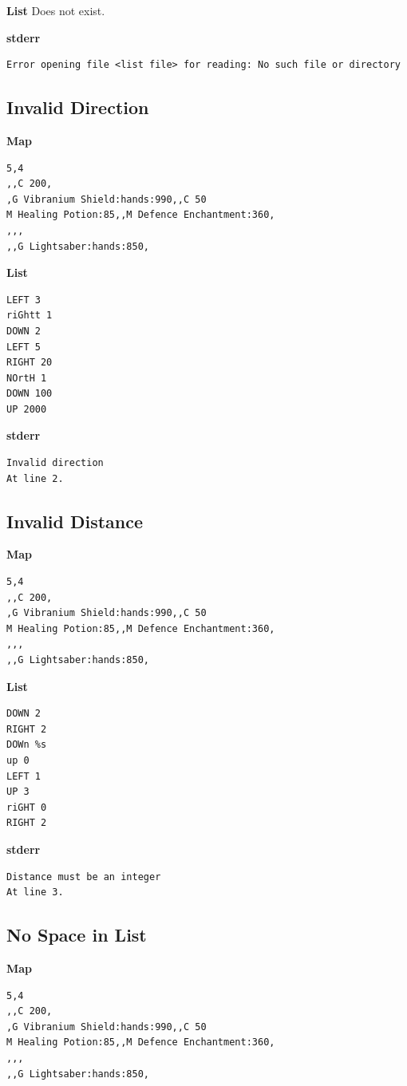 \documentclass{article}
\begin{document}
\textbf{List}
Does not exist.
\pagebreak

\textbf{stderr}
\begin{lstlisting}
Error opening file <list file> for reading: No such file or directory
\end{lstlisting}

\subsection{Invalid Direction}
\quad \textbf{Map}
\begin{lstlisting}
5,4
,,C 200,
,G Vibranium Shield:hands:990,,C 50
M Healing Potion:85,,M Defence Enchantment:360,
,,,
,,G Lightsaber:hands:850,
\end{lstlisting}

\textbf{List}
\begin{lstlisting}
LEFT 3
riGhtt 1
DOWN 2
LEFT 5
RIGHT 20
NOrtH 1
DOWN 100
UP 2000
\end{lstlisting}
\pagebreak

\textbf{stderr}
\begin{lstlisting}
Invalid direction
At line 2.
\end{lstlisting}

\subsection{Invalid Distance}

\quad \textbf{Map}
\begin{lstlisting}
5,4
,,C 200,
,G Vibranium Shield:hands:990,,C 50
M Healing Potion:85,,M Defence Enchantment:360,
,,,
,,G Lightsaber:hands:850,
\end{lstlisting}

\textbf{List}
\begin{lstlisting}
DOWN 2
RIGHT 2
DOWn %s
up 0
LEFT 1
UP 3
riGHT 0
RIGHT 2
\end{lstlisting}
\pagebreak

\textbf{stderr}
\begin{lstlisting}
Distance must be an integer
At line 3.
\end{lstlisting}

\subsection{No Space in List}

\quad \textbf{Map}
\begin{lstlisting}
5,4
,,C 200,
,G Vibranium Shield:hands:990,,C 50
M Healing Potion:85,,M Defence Enchantment:360,
,,,
,,G Lightsaber:hands:850,
\end{lstlisting}
\end{document}
